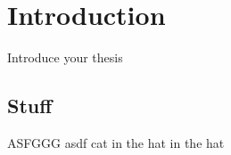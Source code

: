 \chapter{Introduction}
\label{chap:intro}

Introduce your thesis \citep{A}

\section{Stuff}

ASFGGG asdf cat in the hat in the hat
